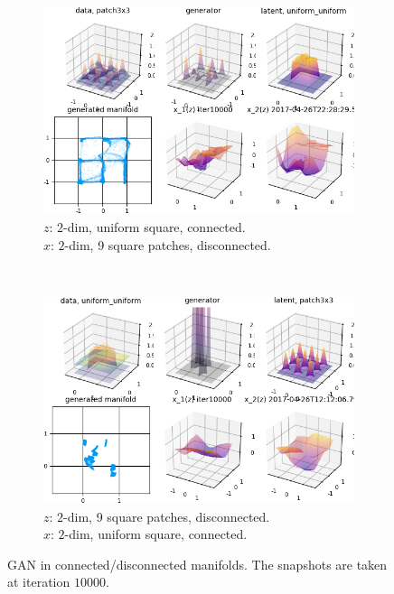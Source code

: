 \begin{figure}[ht]
\centering
    \begin{subfigure}[t]{0.45\textwidth}
        \includegraphics[width=\linewidth]{"fig/uniformuniform_patch3x3_000100"}
        \caption{$z$: $2$-dim, uniform square, connected.\\
            $x$: $2$-dim, 9 square patches, disconnected.}
    \end{subfigure}
    ~
    \begin{subfigure}[t]{0.45\textwidth}
        \includegraphics[width=\linewidth]{"fig/patch3x3_uniformuniform_000100"}
        \caption{$z$: $2$-dim, 9 square patches, disconnected.\\
            $x$: $2$-dim, uniform square, connected.}
    \end{subfigure}
    \caption{\small
        GAN in connected/disconnected manifolds.
        The snapshots are taken at iteration $10000$.
        }
    \label{fig:conn}
\end{figure}


